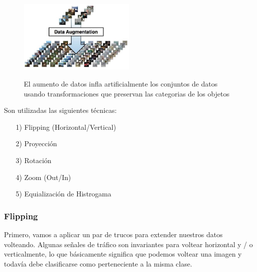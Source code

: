 		\begin{figure}[H]
		\begin{center}
		\includegraphics[width=0.5\textwidth ]{images/desarrollo/Augment/exampleaug}
		\end{center}
		\begin{center}
		\caption{\small{El aumento de datos infla artificialmente los conjuntos de datos usando transformaciones que preservan las categorias de los objetos}}
		{\small{\cite{DL_augmentData}}}
		\end{center}
		\vspace{-1.5em}
		\end{figure}


		Son utilizadas las siguientes técnicas:
		\begin{enumerate}
		\item[1)] Flipping (Horizontal/Vertical)
		\item[2)] Proyección
		\item[3)] Rotación
		\item[4)] Zoom (Out/In)
		\item[5)] Equialización de Histrogama
		\vskip 3cm
		\end{enumerate} 
		
		\subsubsection{Flipping}
		
			Primero, vamos a aplicar un par de trucos para extender nuestros datos volteando. Algunas señales de tráfico son invariantes para voltear horizontal y / o verticalmente, lo que básicamente significa que podemos voltear una imagen y todavía debe clasificarse como perteneciente a la misma clase.

